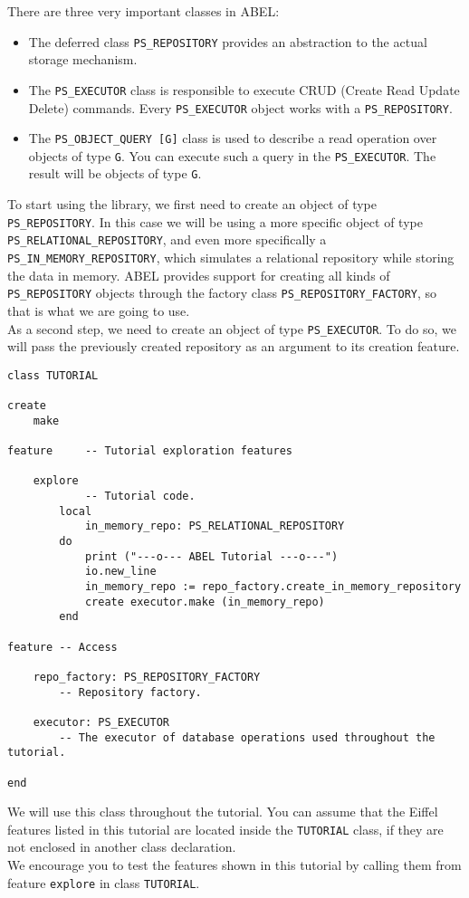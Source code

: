 \documentclass[a4paper,12pt]{report}
\begin{document}
There are three very important classes in ABEL:
\begin{itemize}
 \item The deferred class \lstinline!PS_REPOSITORY! provides an abstraction to the actual storage mechanism.
 \item The \lstinline!PS_EXECUTOR! class is responsible to execute CRUD (Create Read Update Delete) commands. Every \lstinline!PS_EXECUTOR! object works with a \lstinline!PS_REPOSITORY!.

 \item The \lstinline!PS_OBJECT_QUERY [G]! class is used to describe a read operation over objects of type \lstinline!G!. You can execute such a query in the \lstinline!PS_EXECUTOR!. 
	The result will be objects of type \lstinline!G!.

 
\end{itemize}
To start using the library, we first need to create an object of type\\
\lstinline!PS_REPOSITORY!. In this case we will be using a more specific object of type \lstinline{PS_RELATIONAL_REPOSITORY}, and even more specifically a  \lstinline!PS_IN_MEMORY_REPOSITORY!, which simulates a relational repository while storing the data in memory. ABEL provides support for creating all kinds of \lstinline!PS_REPOSITORY! objects through the factory class \lstinline!PS_REPOSITORY_FACTORY!, so that is what we are going to use.\\
As a second step, we need to create an object of type  \lstinline{PS_EXECUTOR}. To do so, we will pass the previously created repository as an argument to its creation feature.

\begin{lstlisting}[language=OOSC2Eiffel, captionpos=b, caption={The TUTORIAL class}, label={lst:tutorial_class}]
class TUTORIAL

create
	make

feature 	-- Tutorial exploration features

	explore
			-- Tutorial code.
		local
			in_memory_repo: PS_RELATIONAL_REPOSITORY
		do
			print ("---o--- ABEL Tutorial ---o---")
			io.new_line
			in_memory_repo := repo_factory.create_in_memory_repository
			create executor.make (in_memory_repo)
		end

feature -- Access

	repo_factory: PS_REPOSITORY_FACTORY
		-- Repository factory.	

	executor: PS_EXECUTOR
		-- The executor of database operations used throughout the tutorial.

end
\end{lstlisting}
We will use this class throughout the tutorial. You can assume that the Eiffel features listed in this tutorial are located inside the \lstinline!TUTORIAL! class, if they are not enclosed in another class declaration.\\ 
We encourage you to test the features shown in this tutorial by calling them from feature \lstinline{explore} in class \lstinline!TUTORIAL!.
\end{document}

